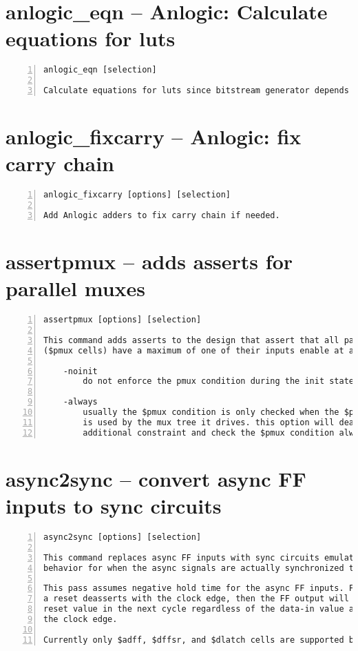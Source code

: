 \section{anlogic\_eqn -- Anlogic: Calculate equations for luts}
\label{cmd:anlogic_eqn}
\begin{lstlisting}[numbers=left,frame=single]
    anlogic_eqn [selection]

Calculate equations for luts since bitstream generator depends on it.
\end{lstlisting}

\section{anlogic\_fixcarry -- Anlogic: fix carry chain}
\label{cmd:anlogic_fixcarry}
\begin{lstlisting}[numbers=left,frame=single]
    anlogic_fixcarry [options] [selection]

Add Anlogic adders to fix carry chain if needed.
\end{lstlisting}

\section{assertpmux -- adds asserts for parallel muxes}
\label{cmd:assertpmux}
\begin{lstlisting}[numbers=left,frame=single]
    assertpmux [options] [selection]

This command adds asserts to the design that assert that all parallel muxes
($pmux cells) have a maximum of one of their inputs enable at any time.

    -noinit
        do not enforce the pmux condition during the init state

    -always
        usually the $pmux condition is only checked when the $pmux output
        is used by the mux tree it drives. this option will deactivate this
        additional constraint and check the $pmux condition always.
\end{lstlisting}

\section{async2sync -- convert async FF inputs to sync circuits}
\label{cmd:async2sync}
\begin{lstlisting}[numbers=left,frame=single]
    async2sync [options] [selection]

This command replaces async FF inputs with sync circuits emulating the same
behavior for when the async signals are actually synchronized to the clock.

This pass assumes negative hold time for the async FF inputs. For example when
a reset deasserts with the clock edge, then the FF output will still drive the
reset value in the next cycle regardless of the data-in value at the time of
the clock edge.

Currently only $adff, $dffsr, and $dlatch cells are supported by this pass.
\end{lstlisting}

